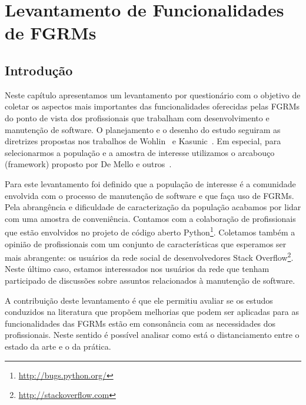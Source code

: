 \chapter{Levantamento de Funcionalidades de FGRMs}\label{ch:pesquisa-profissionais}

\section{Introdução}\label{sec:pesquisa-profissionais-intro}

Neste capítulo apresentamos um levantamento por questionário com o objetivo de
coletar os aspectos mais importantes das funcionalidades oferecidas pelas FGRMs
do ponto de vista dos profissionais que trabalham com desenvolvimento e
manutenção de software. O planejamento e o desenho do estudo seguiram as
diretrizes propostas nos trabalhos de Wohlin~\cite{wohlin2012experimentation} e
Kasunic~\cite{kasunic2005designing}. Em especial, para selecionarmos a
população e a amostra de interesse utilizamos o arcabouço (framework) proposto
por De Mello e outros~\cite{de2015investigating, de2014towards}.

Para este levantamento foi definido que a população de interesse é a comunidade
envolvida com o processo de manutenção de software e que faça uso de FGRMs.
Pela abrangência e dificuldade de caracterização da população acabamos por
lidar com uma amostra de conveniência. Contamos com a colaboração de
profissionais que estão envolvidos no projeto de código aberto
Python\footnote{\url{http://bugs.python.org/}}. Coletamos também a opinião de
profissionais com um conjunto de características que esperamos ser mais
abrangente: os usuários da rede social de desenvolvedores Stack
Overflow\footnote{\url{http://stackoverflow.com}}. Neste último caso, estamos
interessados nos usuários da rede que tenham participado de discussões sobre
assuntos relacionados à manutenção de software.

A contribuição deste levantamento é que ele permitiu avaliar se os estudos
conduzidos na literatura que propõem melhorias que podem ser aplicadas para as
funcionalidades das FGRMs estão em consonância com as necessidades dos
profissionais. Neste sentido é possível analisar como está o distanciamento
entre o estado da arte e o da prática.

